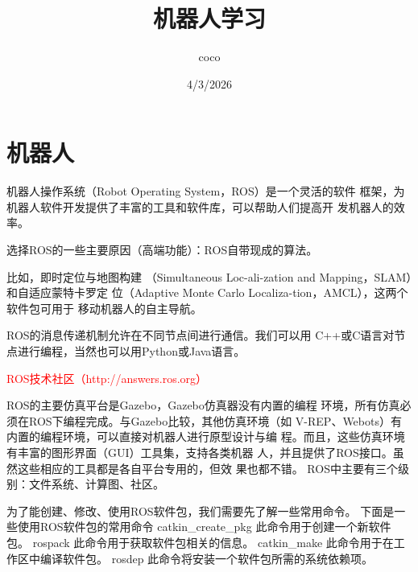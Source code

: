 \documentclass[a4paper]{article}
\title{\heiti\zihao{2} 机器人学习}
\author{\songti coco}
\date{4/3/2026}
\begin{document}
    \maketitle
\section{机器人}





\newcommand{\textred}[1]{\textcolor{red}{#1}\par}



机器人操作系统（Robot Operating System，ROS）是一个灵活的软件
框架，为机器人软件开发提供了丰富的工具和软件库，可以帮助人们提高开
发机器人的效率。

选择ROS的一些主要原因（高端功能）：ROS自带现成的算法。

比如，即时定位与地图构建
（Simultaneous Loc-ali-zation and Mapping，SLAM）和自适应蒙特卡罗定
位（Adaptive Monte Carlo Localiza-tion，AMCL），这两个软件包可用于
移动机器人的自主导航。

ROS的消息传递机制允许在不同节点间进行通信。我们可以用
C++或C语言对节点进行编程，当然也可以用Python或Java语言。

\textred{ROS技术社区（http://answers.ros.org）}

ROS的主要仿真平台是Gazebo，Gazebo仿真器没有内置的编程
环境，所有仿真必须在ROS下编程完成。与Gazebo比较，其他仿真环境（如
V-REP、Webots）有内置的编程环境，可以直接对机器人进行原型设计与编
程。而且，这些仿真环境有丰富的图形界面（GUI）工具集，支持各类机器
人，并且提供了ROS接口。虽然这些相应的工具都是各自平台专用的，但效
果也都不错。
ROS中主要有三个级别：文件系统、计算图、社区。

为了能创建、修改、使用ROS软件包，我们需要先了解一些常用命令。
下面是一些使用ROS软件包的常用命令
catkin\_create\_pkg 此命令用于创建一个新软件包。
rospack 此命令用于获取软件包相关的信息。
catkin\_make 此命令用于在工作区中编译软件包。
rosdep 此命令将安装一个软件包所需的系统依赖项。
\end{document}
